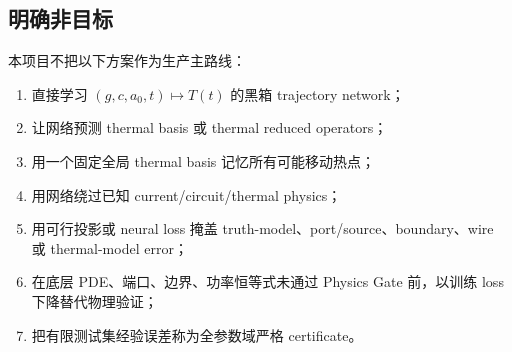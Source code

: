 \subsection{明确非目标}
本项目不把以下方案作为生产主路线：
\begin{enumerate}
  \item 直接学习 $(g,c,a_0,t)\mapsto T(t)$ 的黑箱 trajectory network；
  \item 让网络预测 thermal basis 或 thermal reduced operators；
  \item 用一个固定全局 thermal basis 记忆所有可能移动热点；
  \item 用网络绕过已知 current/circuit/thermal physics；
  \item 用可行投影或 neural loss 掩盖 truth-model、port/source、boundary、wire 或 thermal-model error；
  \item 在底层 PDE、端口、边界、功率恒等式未通过 Physics Gate 前，以训练 loss 下降替代物理验证；
  \item 把有限测试集经验误差称为全参数域严格 certificate。
\end{enumerate}
